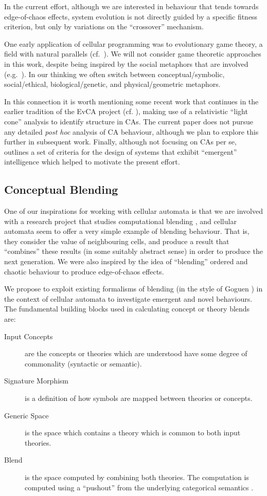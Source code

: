 \documentclass{AISB2008}
\begin{document}
In the current effort, although we are interested in behaviour that
tends towards edge-of-chaos effects, system evolution is not directly
guided by a specific fitness criterion, but only by variations on the
``crossover'' mechanism.

One early application of cellular programming was to evolutionary game
theory, a field with natural parallels
(cf.~\cite{nowak1992evolutionary}).  We will not consider game
theoretic approaches in this work, despite being inspired by the
social metaphors that are involved (e.g.~\cite{nowak2006five}).  In
our thinking we often switch between conceptual/symbolic,
social/ethical, biological/genetic, and physical/geometric metaphors.

In this connection it is worth mentioning some recent work
\cite{goerg2012licors,goerg2012mixed} that continues in the earlier
tradition of the EvCA project (cf. \cite{hordijk2001upper}), making
use of a relativistic ``light cone'' analysis to identify structure in
CAs.  The current paper does not pursue any detailed \emph{post hoc}
analysis of CA behaviour, although we plan to explore this further in
subsequent work.  Finally, although not focusing on CAs per se,
\cite{hofstadter1995prolegomena} outlines a set of criteria for the
design of systems that exhibit ``emergent'' intelligence which helped
to motivate the present effort.


\subsection{Conceptual Blending} \label{sec:blend}

One of our inspirations for working with cellular automata is that we
are involved with a research project that studies computational
blending \cite{schorlemmer2014coinvent}, and cellular automata seem to
offer a very simple example of blending behaviour.  That is, they
consider the value of neighbouring cells, and produce a result that
``combines'' these results (in some suitably abstract sense) in order
to produce the next generation.  We were also inspired by the idea of
``blending'' ordered and chaotic behaviour to produce edge-of-chaos
effects.

We propose to exploit existing formalisms of blending (in the style of
Goguen \cite{gog05}) in the context of cellular automata to
investigate emergent and novel behaviours.  The fundamental building
blocks used in calculating concept or theory blends are:
\begin{description}
\item[Input Concepts] are the concepts or theories which are understood have some degree of commonality (syntactic or semantic). 
\item[Signature Morphism] is a definition of how symbols are mapped between theories or concepts. 
\item[Generic Space] is the space which contains a theory which is common to both input theories.
\item[Blend] is the space computed by combining both theories. The computation is computed using a ``pushout'' from the underlying categorical semantics \cite{MossakowskiEA06}. 
\end{description}
\end{document}
